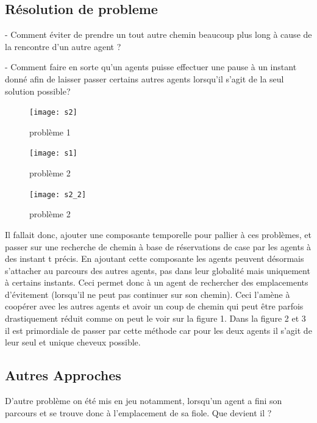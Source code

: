 \documentclass{article}
\begin{document}
\subsection{Résolution de probleme}


 - Comment éviter de prendre un tout autre chemin beaucoup plus long à cause de la rencontre d’un autre agent ?

 - Comment faire en sorte qu’un agents puisse effectuer une pause à un instant donné afin de laisser passer certains autres agents lorsqu'il s'agit de la seul solution possible?


\begin{figure}[h]
   \begin{minipage}{0.5\textwidth}
     \centering
     \texttt{[image: s2]}
     \caption{problème 1 }\label{Fig:1}
   \end{minipage}\hfill
   \begin{minipage}{0.5\textwidth}
     \centering
     \texttt{[image: s1]}
     \caption{problème 2}\label{Fig:2}
     \end{minipage}
\end{figure}

\begin{figure}[h]
     \centering
     \texttt{[image: s2\_2]}
     \caption{problème 2}\label{Fig:3}
\end{figure}
Il fallait donc, ajouter une composante temporelle pour pallier à ces problèmes, et passer sur une recherche de chemin à base de réservations de case par les  agents à des instant t précis. En ajoutant cette composante les agents peuvent désormais s’attacher au parcours des autres agents, pas dans leur globalité mais uniquement à certains instants. Ceci permet donc à un agent de rechercher des emplacements d’évitement (lorsqu’il ne peut pas continuer sur son chemin). Ceci l'amène à coopérer avec les autres agents et avoir un coup de chemin qui peut être parfois drastiquement réduit comme on peut le voir sur la figure 1. Dans la figure 2 et 3 il est primordiale de passer par cette méthode car pour les deux agents il s'agit de leur seul et unique cheveux possible.
\\

\newpage

\subsection{Autres Approches}
D’autre problème on été mis en jeu notamment, lorsqu’un agent a fini son parcours et se trouve donc à l’emplacement de sa fiole. Que devient il ?\\
\end{document}
